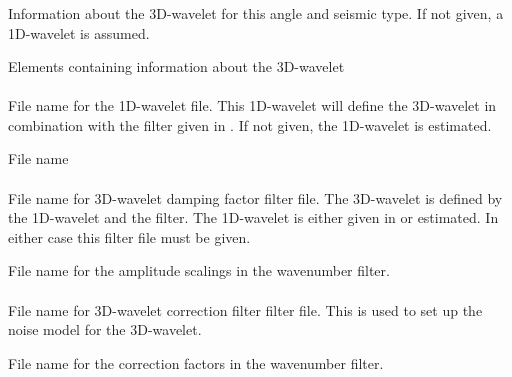 \subsubsection{}
 \slist
   \item \Description Information about the 3D-wavelet for this angle and seismic type. If not given, a 1D-wavelet is assumed.
   \item \Argument Elements containing information about the 3D-wavelet
   \item \Default
 \elist

\paragraph{}
 \slist
   \item \Description File name for the 1D-wavelet file. This 1D-wavelet will define the 3D-wavelet in combination with the filter given in . If not given, the 1D-wavelet is estimated.
   \item \Argument File name
   \item \Default
 \elist

\paragraph{}
 \slist
   \item \Description File name for 3D-wavelet damping factor filter file. The 3D-wavelet is defined by the 1D-wavelet and the filter. The 1D-wavelet is either given in  or estimated. In either case this filter file must be given.
   \item \Argument File name for the amplitude scalings in the wavenumber filter.
   \item \Default
 \elist

\paragraph{}
 \slist
   \item \Description File name for 3D-wavelet correction filter filter file. This is used to set up the noise model for the 3D-wavelet.
   \item \Argument File name for the correction factors in the wavenumber filter.
   \item \Default
 \elist


